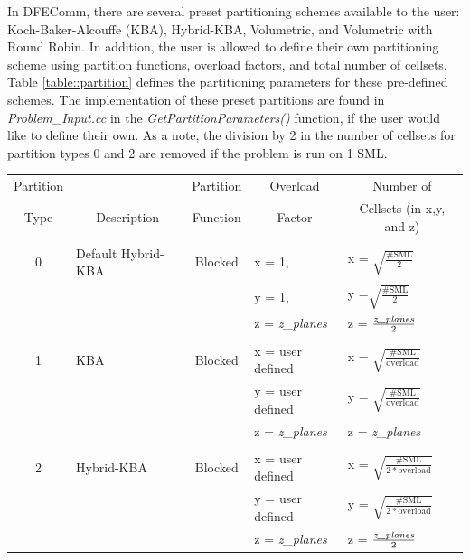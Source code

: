 \documentclass{article}
\begin{document}
 In DFEComm, there are several preset partitioning schemes available to the user: Koch-Baker-Alcouffe (KBA), Hybrid-KBA, Volumetric, and Volumetric with Round Robin. In addition, the user is allowed to define their own partitioning scheme using partition functions, overload factors, and total number of cellsets. Table \ref{table::partition} defines the partitioning parameters for these pre-defined schemes. The implementation of these preset partitions are found in \emph{Problem\_Input.cc} in the \emph{GetPartitionParameters()} function, if the user would like to define their own. As a note, the division by 2 in the number of cellsets for partition types 0 and 2 are removed if the problem is run on 1 SML.\\

\begin{table}[H]
\begin{center}
  \begin{tabular}{ |c| p{4cm}| c| p{3cm}| p{3.0cm}|}
    \hline
    Partition &  & Partition & \multicolumn{1}{c|}{Overload} &\multicolumn{1}{c|}{ Number of } \\ 
    Type & \multicolumn{1}{c|}{Description} &  Function &  \multicolumn{1}{c|}{ Factor} &\multicolumn{1}{c|}{Cellsets (in x,y, and z) }\\ 
    \hline& & & &\\ [-1.5ex]
    0 & Default Hybrid-KBA & Blocked  & x = 1, & x = $\sqrt{\frac{\text{\# SML}}{2}}$  \\  
     &  && y = 1,  & y =$\sqrt{\frac{\text{\# SML}}{2}}$ \\  
     & & & z = \emph{z\_planes} &  z = $\frac{\emph{z\_planes}}{2}$\\
    \hline& & & &\\ [-1.5ex]
     1 & KBA & Blocked  & x = user defined & x = $\sqrt{\frac{\text{\# SML}}{\text{overload}}}$ \\  
     &   && y =  user defined  & y = $\sqrt{\frac{\text{\# SML}}{\text{overload}}}$ \\  
     & & & z = \emph{z\_planes} &  z = \emph{z\_planes}\\
     \hline& & & &\\ [-1.5ex]
    2 & Hybrid-KBA & Blocked  & x = user defined & x = $\sqrt{\frac{\text{\# SML}}{2*\text{overload}}}$  \\  
     &  && y = user defined  & y = $\sqrt{\frac{\text{\# SML}}{2*\text{overload}}}$ \\  
     & & & z = \emph{z\_planes} & z = $\frac{\emph{z\_planes}}{2}$\\

\end{tabular}
\end{center}
\end{table}
\end{document}
